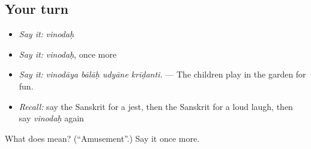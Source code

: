 \subsection*{Your turn}
\begin{itemize}
\raggedright
  \item \emph{Say it:} \emph{vinodaḥ}
  \item \emph{Say it:} \emph{vinodaḥ}, once more
  \item \emph{Say it:} \emph{vinodāya bālāḥ udyāne krīḍanti.} — The children play in the garden for fun.
  \item \emph{Recall:} say the Sanskrit for a jest, then the Sanskrit for a loud laugh, then say \emph{vinodaḥ} again
\end{itemize}

\begin{tcolorbox}[breakable,colback=teal!4,colframe=teal!35!black,title={Before you move on}]
What does  mean? (\textquotedblleft{}Amusement\textquotedblright{}.) Say it once more.
\end{tcolorbox}

